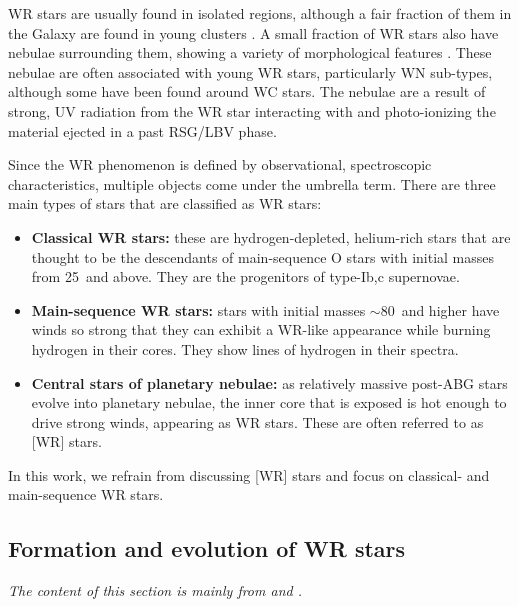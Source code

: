 WR stars are usually found in isolated regions, although a fair fraction of them in the Galaxy are found in young clusters \citep{rosslowe_spatial_2015}. A small fraction of WR stars also have nebulae surrounding them, showing a variety of morphological features \citep{toala_wise_2015}. These nebulae are often associated with young WR stars, particularly WN sub-types, although some have been found around WC stars. The nebulae are a result of strong, UV radiation from the WR star interacting with and photo-ionizing the material ejected in a past RSG/LBV phase. 

Since the WR phenomenon is defined by observational, spectroscopic characteristics, multiple objects come under the umbrella term. There are three main types of stars that are classified as WR stars:

\begin{itemize}
    \item \textbf{Classical WR stars:} these are hydrogen-depleted, helium-rich stars that are thought to be the descendants of main-sequence O stars with initial masses from 25\,\Msun{} and above. They are the progenitors of type-Ib,c supernovae. 
    \item \textbf{Main-sequence WR stars:} stars with initial masses ${\sim}80\,$\Msun{} and higher have winds so strong that they can exhibit a WR-like appearance while burning hydrogen in their cores. They show lines of hydrogen in their spectra.
    \item \textbf{Central stars of planetary nebulae:} as relatively massive post-ABG stars evolve into planetary nebulae, the inner core that is exposed is hot enough to drive strong winds, appearing as WR stars. These are often referred to as [WR] stars.
\end{itemize}

In this work, we refrain from discussing [WR] stars and focus on classical- and main-sequence WR stars.

\subsection{Formation and evolution of WR stars}

\textit{The content of this section is mainly from \citet{crowther_physical_2007} and \citet{shenar_why_2020}.}

